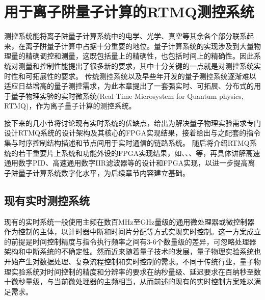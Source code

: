 
\chapter[用于离子阱量子计算的RTMQ测控系统]{用于离子阱量子计算的RTMQ测控系统\label{section:fpga_rtmq}}


测控系统能将离子阱量子计算系统中的电学、光学、真空等其余各个部分联系起来，在离子阱量子计算中占据十分重要的地位。量子计算系统的实现涉及到大量物理量的精确调控和测量，这既包括量上的精确性，也包括时间上的精确性。因此系统对测量和控制性能提出了很多新的要求，其中十分关键的一点就是对测控系统实时性和可拓展性的要求。
传统测控系统以及早些年开发的量子测控系统逐渐难以适应日益增高的量子测控需求，为此本章提出了一套强实时、可拓展、分布式的用于量子物理实验的实时微系统(Real Time Microsystem for Quantum physics, RTMQ)，作为离子量子计算的测控系统。

接下来的几小节将讨论现有实时系统的优缺点，给出为解决量子物理实验需求专门设计RTMQ系统的设计架构及其核心的FPGA实现结果，接着给出与之配套的指令集与时序控制结构描述和节点间用于实时通信的链路系统。
随后将介绍RTMQ系统的若干重要片上系统和功能外设的FPGA实现结果，如、、、等，再具体讲解高速通用数字PID、高速通用数字IIR滤波器等的设计和FPGA实现，以进一步提高离子阱量子计算系统数字化水平，为后续章节内容建立基础。

\section[现有实时测控系统]{现有实时测控系统}


现有的实时系统一般使用主频在数百MHz至GHz量级的通用微处理器或微控制器作为控制的主体，以计时器中断和时间片分配等方式实现实时控制。这一方案成立的前提是时间控制精度与指令执行频率之间有3-6个数量级的差异，可忽略处理器架构和中断系统的不确定性。然而近来随着量子技术的发展，量子物理实验系统也开始产生对数据处理、复杂流程控制和实时控制的需求。不同于传统行业，量子物理实验系统对时间控制的精度和分辨率的要求在纳秒量级、延迟要求在百纳秒至数十微秒量级\cite[]{junhua03}，与当前微处理器的主频相当，从而前述的现有的实时控制方案难以满足需求。

